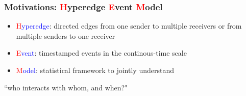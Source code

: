 \documentclass{beamer}
\begin{document}
\begin{frame}
		\frametitle{Motivations: \textcolor{red}{H}yperedge \textcolor{red}{E}vent \textcolor{red}{M}odel}
		\normalsize	\begin{itemize}
			\item \textcolor{red}{H}\textcolor{blue}{yperedge}: directed edges from one sender to multiple receivers or from multiple senders to one receiver\vspace{0.15cm}
			\item \textcolor{red}{E}\textcolor{blue}{vent}:
			timestamped events in the continous-time scale\vspace{0.15cm}
			\item  \textcolor{red}{M}\textcolor{blue}{odel}: statistical framework to jointly understand\\\vspace{0.15cm}
		\end{itemize}
		\centering\Large
		``who interacts with whom, and when?"
\end{frame}
\end{document}
